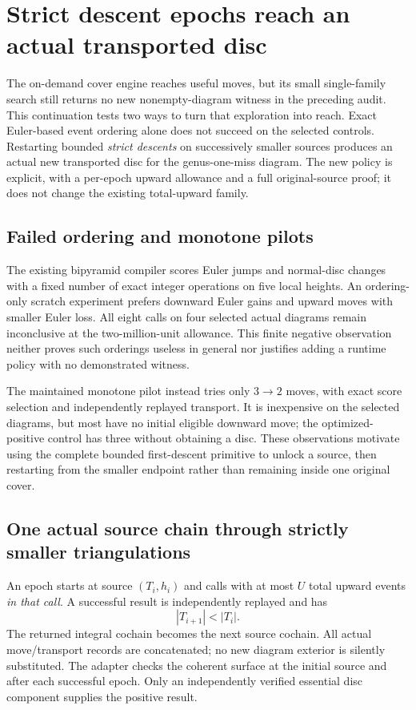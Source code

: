 \section{Strict descent epochs reach an actual transported disc}
\label{sec:pachner-epochs}

The on-demand cover engine reaches useful moves, but its small single-family
search still returns no new nonempty-diagram witness in the preceding audit.
This continuation tests two ways to turn that exploration into reach. Exact
Euler-based event ordering alone does not succeed on the selected controls.
Restarting bounded \emph{strict descents} on successively smaller sources
produces an actual new transported disc for the genus-one-miss diagram.
The new policy is explicit, with a per-epoch upward allowance and a full
original-source proof; it does not change the existing total-upward family.

\subsection{Failed ordering and monotone pilots}

The existing bipyramid compiler scores Euler jumps and normal-disc changes
with a fixed number of exact integer operations on five local heights.
An ordering-only scratch experiment prefers downward Euler gains and upward
moves with smaller Euler loss. All eight calls on four selected actual
diagrams remain inconclusive at the two-million-unit allowance. This finite
negative observation neither proves such orderings useless in general nor
justifies adding a runtime policy with no demonstrated witness.

The maintained monotone  pilot instead tries only
$3\to2$ moves, with exact score selection and independently replayed transport.
It is inexpensive on the selected diagrams, but most have no initial
eligible downward move; the optimized-positive control has three without
obtaining a disc. These observations motivate using the complete bounded
first-descent primitive to unlock a source, then restarting from the smaller
endpoint rather than remaining inside one original cover.

\subsection{One actual source chain through strictly smaller triangulations}

An epoch starts at source $(T_i,h_i)$ and calls
 with at most $U$ total upward events \emph{in that
call}. A successful result is independently replayed and has
\[
                     |T_{i+1}|<|T_i|.
\]
The returned integral cochain becomes the next source cochain. All actual
move/transport records are concatenated; no new diagram exterior is silently
substituted. The adapter checks the coherent surface at the initial source
and after each successful epoch. Only an independently verified essential
disc component supplies the positive result.

